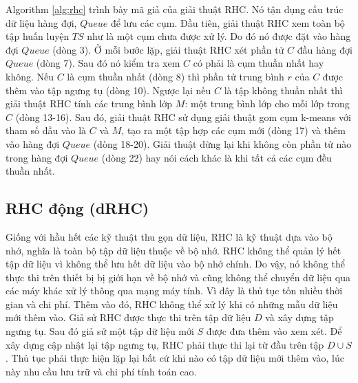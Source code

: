 \documentclass[13pt,oneside]{scrbook}
\begin{document}
Algorithm \ref{alg:rhc} trình bày mã giả của giải thuật RHC.
Nó tận dụng cấu trúc dữ liệu hàng đợi, $Queue$ để lưu các cụm.
Đầu tiên, giải thuật RHC xem toàn bộ tập huấn luyện $TS$ như là một cụm chưa được xử lý. Do đó nó được đặt vào hàng đợi $Queue$ (dòng 3).
Ở mỗi bước lặp, giải thuật RHC xét phần tử $C$ đầu hàng đợi $Queue$ (dòng 7).
Sau đó nó kiểm tra xem $C$ có phải là cụm thuần nhất hay không.
Nếu $C$ là cụm thuần nhất (dòng 8) thì phần tử trung bình $r$ của $C$ được thêm vào tập ngưng tụ (dòng 10).
Ngược lại nếu $C$ là tập không thuần nhất thì giải thuật RHC tính các trung bình lớp $M$: một trung bình lớp cho mỗi lớp trong $C$ (dòng 13-16).
Sau đó, giải thuật RHC sử dụng giải thuật gom cụm k-means với tham số đầu vào là $C$ và $M$, tạo ra một tập hợp các cụm mới (dòng 17) và thêm vào hàng đợi $Queue$ (dòng 18-20).
Giải thuật dừng lại khi không còn phần tử nào trong hàng đợi $Queue$ (dòng 22) hay nói cách khác là khi tất cả các cụm đều thuần nhất.
\subsection{RHC động (dRHC)}
Giống với hầu hết các kỹ thuật thu gọn dữ liệu, RHC là kỹ thuật dựa vào bộ nhớ, nghĩa là toàn bộ tập dữ liệu thuộc về bộ nhớ. 
RHC không thể quản lý hết tập dữ liệu vì không thể lưu hết dữ liệu vào bộ nhớ chính. 
Do vậy, nó không thể thực thi trên thiết bị bị giới hạn về bộ nhớ và cũng không thể chuyển dữ liệu qua các máy khác xử lý thông qua mạng máy tính. 
Vì đây là thủ tục tốn nhiều thời gian và chi phí. 
Thêm vào đó, RHC không thể xử lý khi có những mẫu dữ liệu mới thêm vào. 
Giả sử RHC được thực thi trên tập dữ liệu $D$ và xây dựng tập ngưng tụ. 
Sau đó giả sử một tập dữ liệu mới $S$ được đưa thêm vào xem xét. 
Để xây dựng cập nhật lại tập ngưng tụ, RHC phải thực thi lại từ đầu trên tập 
$D \cup S$. 
Thủ tục phải thực hiện lặp lại  bất cứ khi nào có tập dữ liệu mới thêm vào, lúc này nhu cầu lưu trữ và chi phí tính toán cao.
\end{document}
